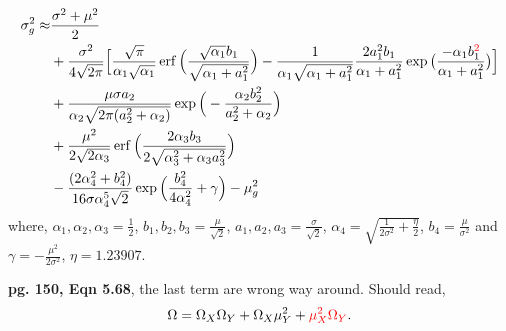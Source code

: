 \documentclass{article}
\DeclareMathOperator{\erf}{erf}
\begin{document}
  \begin{align*}
    \sigma_{g}^2 \approx & \frac{\sigma^{2} + \mu^{2}}{2} \nonumber
                 \\
              &+
                \frac{\sigma^{2}}{4\sqrt{2\pi}} \Big[ \frac{\sqrt{\pi}}{\alpha_{1} \sqrt{\alpha_{1}}}
                \erf\Big({\frac{\sqrt{\alpha_{1}}b_{1}}{\sqrt{\alpha_{1} + a_{1}^{2}}}}\Big)
                -  \frac{1}{\alpha_{1}\sqrt{\alpha_{1} + a_{1}^{2}}} \frac{2a_{1}^{2}b_{1}}{\alpha_{1} + a_{1}^{2}}
                \exp{\big(\frac{-\alpha_{1} b_{1}^{\textcolor{red}{2}}}{\alpha_{1} + a_{1}^{2}}\big)} \Big] \nonumber
    \\%
              & +
                \frac{\mu \sigma a_{2}}{\alpha_{2}\sqrt{2\pi(a_{2}^{2} + \alpha_{2})}}
                \exp\Big( - \frac{\alpha_{2} b_{2}^{2}}{a_{2}^{2} + \alpha_{2}} \Big) \nonumber
    \\%
              & +
                \frac{\mu^{2}}{2\sqrt{2\alpha_{3}}} \erf\Big(
                \frac{2\alpha_{3}b_{3}}{2\sqrt{\alpha_{3}^{2} + \alpha_{3}a_{3}^{2}}} \Big) \nonumber
    \\%
              & - \frac{(2\alpha_{4}^{2} + b_{4}^{2})}{16\sigma\alpha_{4}^{5}\sqrt{2}}
                \exp \Big(
                \frac{b_{4}^{2}}{4\alpha_{4}^{2}} + \gamma \Big)
                - \mu_{g}^{2}
  \end{align*}
  where, $\alpha_{1}, \alpha_{2}, \alpha_{3} = \frac{1}{2}$, $b_{1},
    b_{2}, b_{3} = \frac{\mu}{\sqrt{2}}$, $a_1, a_{2},
    a_{3} = \frac{\sigma}{\sqrt{2}}$, $\alpha_{4} =
    \sqrt{\frac{1}{2\sigma^{2}} + \frac{\eta}{2}}$, $b_{4} =
    \frac{\mu}{\sigma^{2}}$ and $\gamma = -\frac{\mu^{2}}{2\sigma^{2}}$, $\eta = 1.23907$.

\textbf{pg. 150, Eqn 5.68}, the last term are wrong way around. Should read,
 \begin{equation*}
    \Omega = \Omega_{X}\Omega_{Y} + \Omega_{X}\mu^{2}_{Y} + \textcolor{red}{\mu^{2}_{X}\Omega_{Y}}.
  \end{equation*}
\end{document}
